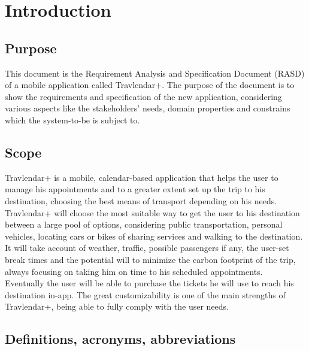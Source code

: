 %
%
\chapter{Introduction}
%
\label{cap:introduction}
%
%
\section{Purpose}
This document is the Requirement Analysis and Specification Document (RASD) of a mobile application called Travlendar+. The purpose of the document is to show the requirements and specification of the new application, considering various aspects like the stakeholders' needs, domain properties and constrains which the system-to-be is subject to.
%
\section{Scope}
Travlendar+ is a mobile, calendar-based application that helps the user to manage his appointments and to a greater extent set up the trip to his destination, choosing the best means of transport depending on his needs. \\
Travlendar+ will choose the most suitable way to get the user to his destination between a large pool of options, considering public transportation, personal vehicles, locating cars or bikes of sharing services and walking to the destination. It will take account of weather, traffic, possible passengers if any, the user-set break times and the potential will to minimize the carbon footprint of the trip, always focusing on taking him on time to his scheduled appointments. \\
Eventually the user will be able to purchase the tickets he will use to reach his destination in-app. The great customizability is one of the main strengths of Travlendar+, being able to fully comply with the user needs. 
%
\section{Definitions, acronyms, abbreviations}
%
